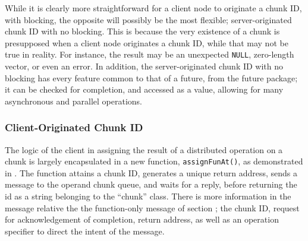 While it is clearly more straightforward for a client node to originate
a chunk ID, with blocking, the opposite will possibly be the most
flexible; server-originated chunk ID with no blocking. This is because
the very existence of a chunk is presupposed when a client node
originates a chunk ID, while that may not be true in reality. For
instance, the result may be an unexpected \texttt{NULL}, zero-length
vector, or even an error. In addition, the server-originated chunk ID
with no blocking has every feature common to that of a future, from the
future package; it can be checked for completion, and accessed as a
value, allowing for many asynchronous and parallel operations.

\hypertarget{client-originated-chunk-id}{%
\subsubsection{Client-Originated Chunk
ID}\label{client-originated-chunk-id}}

The logic of the client in assigning the result of a distributed
operation on a chunk is largely encapsulated in a new function,
\texttt{assignFunAt()}, as demonstrated in \cite{lst:ro-ass-client}. The
function attains a chunk ID, generates a unique return address, sends a
message to the operand chunk queue, and waits for a reply, before
returning the id as a string belonging to the ``chunk'' class. There is
more information in the message relative the the function-only message
of section \cite{sec:val-ret}; the chunk ID, request for acknowledgement
of completion, return address, as well as an operation specifier to
direct the intent of the message.

